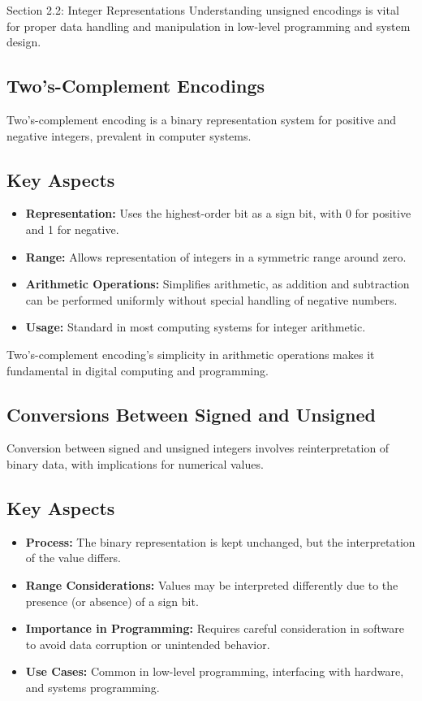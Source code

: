 \begin{notes}{Section 2.2: Integer Representations}
    Understanding unsigned encodings is vital for proper data handling and manipulation in low-level programming and system design.
    
    \subsection*{Two's-Complement Encodings}

    Two's-complement encoding is a binary representation system for positive and negative integers, prevalent in computer systems.
    
    \subsection*{Key Aspects}
    
    \begin{itemize}
        \item \textbf{Representation:} Uses the highest-order bit as a sign bit, with 0 for positive and 1 for negative.
        \item \textbf{Range:} Allows representation of integers in a symmetric range around zero.
        \item \textbf{Arithmetic Operations:} Simplifies arithmetic, as addition and subtraction can be performed uniformly without special handling of negative numbers.
        \item \textbf{Usage:} Standard in most computing systems for integer arithmetic.
    \end{itemize}
    
    Two's-complement encoding's simplicity in arithmetic operations makes it fundamental in digital computing and programming.    

    \subsection*{Conversions Between Signed and Unsigned}

    Conversion between signed and unsigned integers involves reinterpretation of binary data, with implications for numerical values.
    
    \subsection*{Key Aspects}

    \begin{itemize}
        \item \textbf{Process:} The binary representation is kept unchanged, but the interpretation of the value differs.
        \item \textbf{Range Considerations:} Values may be interpreted differently due to the presence (or absence) of a sign bit.
        \item \textbf{Importance in Programming:} Requires careful consideration in software to avoid data corruption or unintended behavior.
        \item \textbf{Use Cases:} Common in low-level programming, interfacing with hardware, and systems programming.
    \end{itemize}
    

\end{notes}

